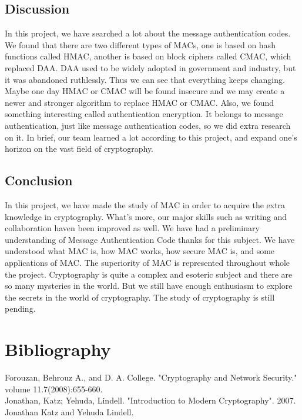 \documentclass[12pt,a4paper,oneside]{report}
\begin{document}
\section{Discussion}
In this project, we have searched a lot about the message authentication codes. We found that there are two different types of MACs, one is based on hash functions called HMAC, another is based on block ciphers called CMAC, which replaced DAA. DAA used to be widely adopted in government and industry, but it was abandoned ruthlessly. Thus we can see that everything keeps changing. Maybe one day HMAC or CMAC will be found insecure and we may create a newer and stronger algorithm to replace HMAC or CMAC. Also, we found something interesting called authentication encryption. It belongs to message authentication, just like message authentication codes, so we did extra research on it. In brief, our team learned a lot according to this project, and expand one's horizon on the vast field of cryptography.\\

\section{Conclusion}
In this project, we have made the study of MAC in order to acquire the extra knowledge in cryptography. What's more, our major skills such as writing and collaboration haven been improved as well. We have had a preliminary understanding of Message Authentication Code thanks for this subject. We have understood what MAC is, how MAC works, how secure MAC is, and some applications of MAC. The superiority of MAC is represented throughout whole the project. Cryptography is quite a complex and esoteric subject and there are so many mysteries in the world. But we still have enough enthusiasm to explore the secrets in the world of cryptography. The study of cryptography is still pending.\\


\chapter{  Bibliography}
\noindent [1] Forouzan, Behrouz A., and D. A. College. "Cryptography and Network Security." volume 11.7(2008):655-660.\\

\noindent [2] Jonathan, Katz; Yehuda, Lindell. "Introduction to Modern Cryptography". 2007. Jonathan Katz and Yehuda Lindell.\\
\end{document}
